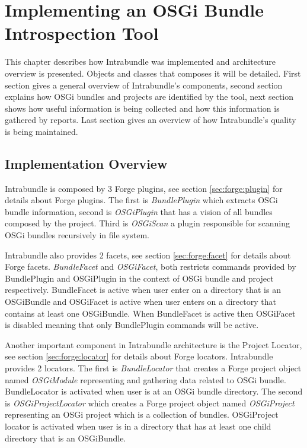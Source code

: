 \chapter{Implementing an OSGi Bundle Introspection Tool}
This chapter describes how Intrabundle was implemented and architecture overview is presented. Objects and classes that composes it will be detailed. First section gives a general overview of Intrabundle's components, second section explains how OSGi bundles and projects are identified by the tool, next section shows how useful information is being collected and how this information is gathered by reports. Last section gives an overview of how Intrabundle's quality is being maintained.   

\section{Implementation Overview}

Intrabundle is composed by 3 Forge plugins, see section \ref{sec:forge:plugin} for details about Forge plugins. The first is \emph{BundlePlugin} which extracts OSGi bundle information, second is \emph{OSGiPlugin} that has a vision of all bundles composed by the project. Third is \emph{OSGiScan} a plugin responsible for scanning OSGi bundles recursively in file system. 


Intrabundle also provides 2 facets, see section \ref{sec:forge:facet} for details about Forge facets. \emph{BundleFacet} and \emph{OSGiFacet}, both restricts commands provided by BundlePlugin and OSGiPlugin in the context of OSGi bundle and project respectively. BundleFacet is active when user enter on a directory that is an OSGiBundle and OSGiFacet is active when user enters on a directory that contains at least one OSGiBundle. When BundleFacet is active then OSGiFacet is disabled meaning that only BundlePlugin commands will be active. 

Another important component in Intrabundle architecture is the Project Locator, see section \ref{sec:forge:locator} for details about Forge locators. Intrabundle provides 2 locators. The first is \emph{BundleLocator} that creates a Forge project object named \emph{OSGiModule} representing and gathering data related to OSGi bundle. BundleLocator is activated when user is at an OSGi bundle directory. The second is \emph{OSGiProjectLocator} which creates a Forge project object named \emph{OSGiProject} representing an OSGi project which is a collection of bundles. OSGiProject locator is activated when user is in a directory that has at least one child directory that is an OSGiBundle.          

